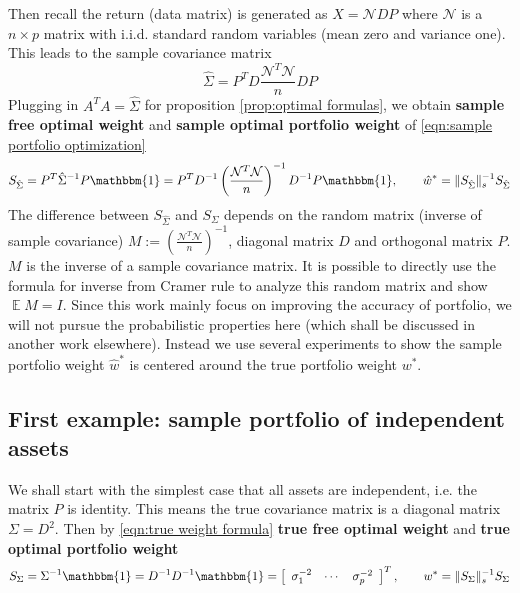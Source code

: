 \documentclass[12pt]{extarticle}
\newcommand{\cN}{{\mathcal{N}}}
\newcommand{\1}{\mathbbm{1}}
\DeclareMathOperator{\E}{\mathbb{E}}
\newcommand{\mat}[2][rrrrrrrrrrrrrrrrrrrrrrrrrrrrrrrr]{\left[ \begin{array}{#1} #2 \\ \end{array}\right]}
\numberwithin{equation}{section}
\begin{document}
Then recall the return (data matrix) is generated as $X= \cN DP$ where $\cN$ is a $n\times p$ matrix with i.i.d. standard  random variables (mean zero and variance one). This leads to the sample covariance matrix 
\[
\hat{\Sigma} = P^T D\frac{\cN^T\cN}{n} D P
\]
Plugging in $A^TA = \hat{\Sigma}$ for proposition \ref{prop:optimal formulas}, we obtain \textbf{sample free optimal weight} and \textbf{sample optimal portfolio weight}
of \ref{eqn:sample portfolio optimization}
\begin{equation}\label{eqn:sample weight formula}
S_{\hat{\Sigma}} = P^T \hat{\Sigma}^{-1} P\1 = P^T D^{-1} \left( \frac{\cN^T\cN}{n}\right)^{-1} D^{-1}P \1 , \qquad \hat{w}^* = \|S_{\hat{\Sigma}}\|_s^{-1} S_{\hat{\Sigma}}
\end{equation}
The difference between $S_{\hat{\Sigma}}$ and $S_{\Sigma}$ depends on the random matrix (inverse of sample covariance) $M:=\left( \frac{\cN^T\cN}{n}\right)^{-1}$, diagonal matrix $D$ and orthogonal matrix $P$.   $M$ is the inverse of a sample covariance matrix. It is possible to directly use the formula for inverse from Cramer rule to analyze this random matrix and show $\E M = I$. Since this work mainly focus on improving the accuracy of portfolio, we will not pursue the probabilistic properties here (which shall be discussed in another work elsewhere).  Instead we use several experiments to show the sample portfolio weight $\hat{w}^*$ is centered around the true portfolio weight $w^*$.


\subsection{First example: sample portfolio of independent assets}


We shall start with the simplest case that all assets are independent, i.e. the matrix $P$ is identity. This means the true covariance matrix is a diagonal matrix 
$
\Sigma =D^2
$.
 Then by \ref{eqn:true weight formula} \textbf{true free optimal weight} and \textbf{true optimal portfolio weight}
\[
S_{\Sigma} = \Sigma^{-1}\1 = D^{-1}D^{-1}\1 = \mat[ccc]{\sigma_1^{-2} & \cdots & \sigma_p^{-2}}^T, \qquad w^* = \|S_{\Sigma} \|_s^{-1} S_{\Sigma} 
\]
\end{document}
